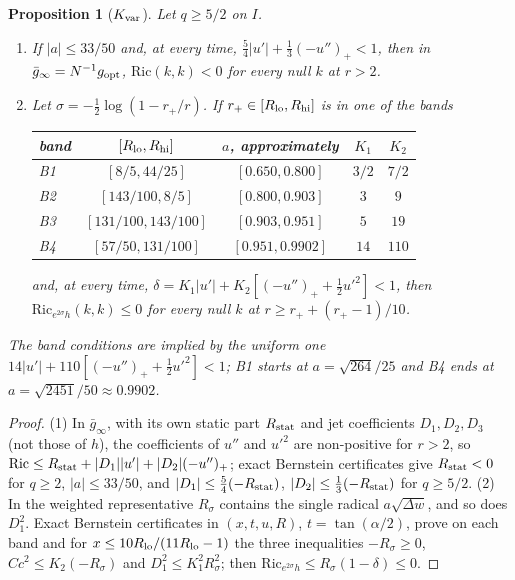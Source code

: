 \documentclass[aip,jmp,amsmath,amssymb,reprint]{revtex4-2}
\newcommand{\gopt}{g_{\rm opt}}
\theoremstyle{plain}
\newtheorem{proposition}{Proposition}[section]
\theoremstyle{definition}
\begin{document}
\begin{proposition}[$K_{\rm var}$]\label{prop:kerr-Kvar}
Let $q\ge5/2$ on $I$.
\begin{enumerate}
\item If $|a|\le33/50$ and, at every time, $\frac54|u'|+\frac13(-u'')_+<1$, then in
  $\bar g_\infty=N^{-1}\gopt$, $\mathrm{Ric}(k,k)<0$ for every null $k$ at $r>2$.
\item Let $\sigma=-\frac12\log(1-r_+/r)$. If $r_+\in[R_{\rm lo},R_{\rm hi}]$ is in one of the bands
  \begin{center}
  \begin{tabular}{lcccc}
  \hline
  band & $[R_{\rm lo},R_{\rm hi}]$ & $a$, approximately & $K_1$ & $K_2$\\
  \hline
  B1 & $[8/5,44/25]$ & $[0.650,0.800]$ & $3/2$ & $7/2$\\
  B2 & $[143/100,8/5]$ & $[0.800,0.903]$ & $3$ & $9$\\
  B3 & $[131/100,143/100]$ & $[0.903,0.951]$ & $5$ & $19$\\
  B4 & $[57/50,131/100]$ & $[0.951,0.9902]$ & $14$ & $110$\\
  \hline
  \end{tabular}
  \end{center}
  and, at every time, $\delta=K_1|u'|+K_2[(-u'')_++\frac12u'^2]<1$, then
  $\mathrm{Ric}_{e^{2\sigma}h}(k,k)\le0$ for every null $k$ at $r\ge r_+ +(r_+-1)/10$.
\end{enumerate}
The band conditions are implied by the uniform one $14|u'|+110[(-u'')_++\frac12u'^2]<1$; B1 starts at
$a=\sqrt{264}/25$ and B4 ends at $a=\sqrt{2451}/50\approx0.9902$.
\end{proposition}

\begin{proof}
(1) In $\bar g_\infty$, with its own static part $R_{\rm stat}$ and jet coefficients $D_1,D_2,D_3$ (not
those of $h$), the coefficients of $u''$ and $u'^2$ are non-positive for $r>2$, so
$\mathrm{Ric}\le R_{\rm stat}+|D_1||u'|+|D_2|(-u'')_+$; exact Bernstein certificates give $R_{\rm stat}<0$ for $q\ge2$,
$|a|\le33/50$, and $|D_1|\le\frac54(-R_{\rm stat})$, $|D_2|\le\frac13(-R_{\rm stat})$ for $q\ge5/2$. (2) In the weighted
representative $R_\sigma$ contains the single radical $a\sqrt{\Delta w}$, and so does $D_1^2$. Exact Bernstein
certificates in $(x,t,u,R)$, $t=\tan(\alpha/2)$, prove on each band and for $x\le10R_{\rm lo}/(11R_{\rm lo}-1)$
the three inequalities $-R_\sigma\ge0$, $Cc^2\le K_2(-R_\sigma)$ and $D_1^2\le K_1^2R_\sigma^2$; then
$\mathrm{Ric}_{e^{2\sigma}h}\le R_\sigma(1-\delta)\le0$.
\end{proof}
\end{document}
